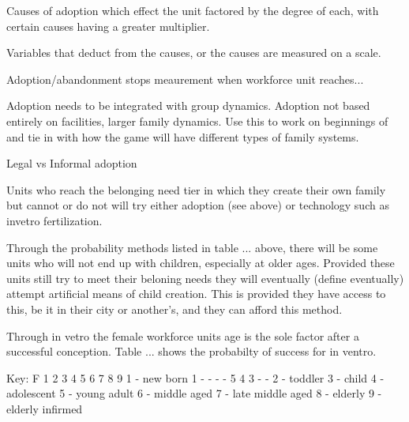 




Causes of adoption which effect the unit factored by the degree of each, with certain causes having a greater multiplier. 

Variables that deduct from the causes, or the causes are measured on a scale.

Adoption/abandonment stops meaurement when workforce unit reaches... 



Adoption needs to be integrated with group dynamics.
Adoption not based entirely on facilities, larger family dynamics.
Use this to work on beginnings of and tie in with how the game will have different types of family systems. 

Legal vs Informal adoption







Units who reach the belonging need tier in which they create their own family but cannot or do not will try either adoption (see above) or technology such as invetro fertilization. 

Through the probability methods listed in table ... above, there will be some units who will not end up with children, especially at older ages. Provided these units still try to meet their beloning needs they will eventually (define eventually) attempt artificial means of child creation. This is provided they have access to this, be it in their city or another's, and they can afford this method.

Through in vetro the female workforce units age is the sole factor after a successful conception. Table ... shows the probabilty of success for in ventro.

			        Key:
F 1  2  3  4  5  6  7  8  9     1 - new born
1 -  -  -  -  5  4  3  -  -     2 - toddler
				3 - child
				4 - adolescent
				5 - young adult
				6 - middle aged
				7 - late middle aged
				8 - elderly 
				9 - elderly infirmed

